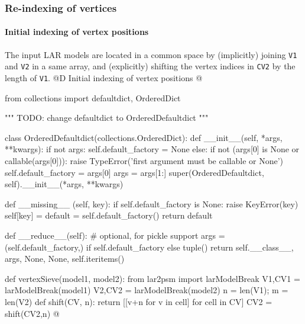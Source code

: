 \documentclass[11pt,oneside]{article}	%
\begin{document}
\subsubsection{Re-indexing of vertices}

\paragraph{Initial indexing of vertex positions}
The input LAR models are located in a common space by (implicitly) joining \texttt{V1} and \texttt{V2} in a same array, and (explicitly) shifting the vertex indices in \texttt{CV2} by the length of \texttt{V1}.
@D Initial indexing of vertex positions
@{from collections import defaultdict, OrderedDict

""" TODO: change defaultdict to OrderedDefaultdict """

class OrderedDefaultdict(collections.OrderedDict):
    def __init__(self, *args, **kwargs):
        if not args:
            self.default_factory = None
        else:
            if not (args[0] is None or callable(args[0])):
                raise TypeError('first argument must be callable or None')
            self.default_factory = args[0]
            args = args[1:]
        super(OrderedDefaultdict, self).__init__(*args, **kwargs)

    def __missing__ (self, key):
        if self.default_factory is None:
            raise KeyError(key)
        self[key] = default = self.default_factory()
        return default

    def __reduce__(self):  # optional, for pickle support
        args = (self.default_factory,) if self.default_factory else tuple()
        return self.__class__, args, None, None, self.iteritems()


def vertexSieve(model1, model2):
	from lar2psm import larModelBreak
	V1,CV1 = larModelBreak(model1) 
	V2,CV2 = larModelBreak(model2)
	n = len(V1); m = len(V2)
	def shift(CV, n): 
		return [[v+n for v in cell] for cell in CV]
	CV2 = shift(CV2,n)
@}
\end{document}
